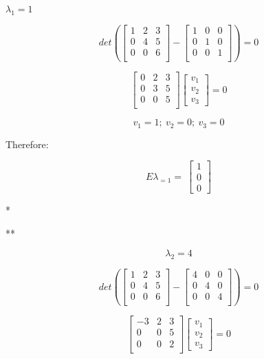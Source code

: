 \documentclass[]{article}
\begin{document}
\(\lambda_1 = 1\)

\[
det( 
\begin{bmatrix}
   1 & 2 & 3 \\
   0 & 4 & 5 \\
   0 & 0 & 6 \\
\end{bmatrix}
-
\begin{bmatrix}
   1 & 0 & 0 \\
   0 & 1  & 0 \\
   0 & 0 & 1 \\
\end{bmatrix}
) = 0
\]

\[
\begin{bmatrix}
   0 & 2 & 3 \\
   0 & 3 & 5 \\
   0 & 0 & 5 \\
\end{bmatrix}
\begin{bmatrix}
v_1 \\
v_2 \\
v_3
\end{bmatrix}
=0
\]

\[v_1 = 1;~v_2 = 0;~v_3 = 0\]

Therefore:

\[
E\lambda_{=1} = \
\begin{bmatrix}
1 \\
0 \\
0
\end{bmatrix}
\]

\newpage
*

**

\[\lambda_2 = 4\]

\[
det( 
\begin{bmatrix}
   1 & 2 & 3 \\
   0 & 4 & 5 \\
   0 & 0 & 6 \\
\end{bmatrix}
-
\begin{bmatrix}
   4 & 0 & 0 \\
   0 & 4  & 0 \\
   0 & 0 & 4 \\
\end{bmatrix}
) = 0
\]

\[
\begin{bmatrix}
   -3 & 2 & 3 \\
   0 & 0 & 5 \\
   0 & 0 & 2 \\
\end{bmatrix}
\begin{bmatrix}
v_1 \\
v_2 \\
v_3
\end{bmatrix}
=0
\]
\end{document}
